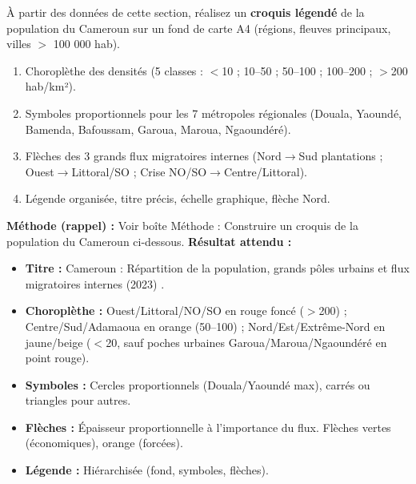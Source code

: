 \documentclass[11pt]{article}
\begin{document}
\begin{exercice}
À partir des données de cette section, réalisez un \textbf{croquis légendé} de la population du Cameroun sur un fond de carte A4 (régions, fleuves principaux, villes $>$ 100 000 hab).
\begin{enumerate}
    \item Choroplèthe des densités (5 classes : $<$10 ; 10--50 ; 50--100 ; 100--200 ; $>$200 hab/km²).
    \item Symboles proportionnels pour les 7 métropoles régionales (Douala, Yaoundé, Bamenda, Bafoussam, Garoua, Maroua, Ngaoundéré).
    \item Flèches des 3 grands flux migratoires internes (Nord$\to$Sud plantations ; Ouest$\to$Littoral/SO ; Crise NO/SO$\to$Centre/Littoral).
    \item Légende organisée, titre précis, échelle graphique, flèche Nord.
\end{enumerate}
\end{exercice}

\begin{corrige}
\textbf{Méthode (rappel) :} Voir boîte \og Méthode : Construire un croquis de la population du Cameroun \fg{} ci-dessous.
\textbf{Résultat attendu :}
\begin{itemize}
    \item \textbf{Titre :} \og Cameroun : Répartition de la population, grands pôles urbains et flux migratoires internes (2023) \fg.
    \item \textbf{Choroplèthe :} Ouest/Littoral/NO/SO en rouge foncé ($>$200) ; Centre/Sud/Adamaoua en orange (50--100) ; Nord/Est/Extrême-Nord en jaune/beige ($<$20, sauf poches urbaines Garoua/Maroua/Ngaoundéré en point rouge).
    \item \textbf{Symboles :} Cercles proportionnels (Douala/Yaoundé max), carrés ou triangles pour autres.
    \item \textbf{Flèches :} Épaisseur proportionnelle à l'importance du flux. Flèches vertes (économiques), orange (forcées).
    \item \textbf{Légende :} Hiérarchisée (fond, symboles, flèches).
\end{itemize}
\end{corrige}
\end{document}
